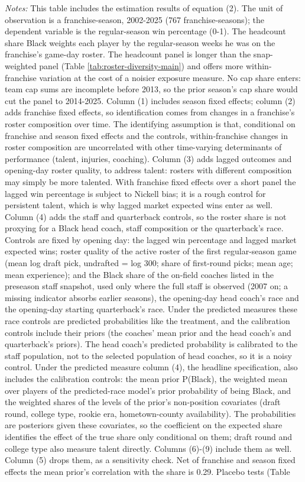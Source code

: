 {\footnotesize
\noindent\textit{Notes:} This table includes the estimation results of equation (2). The unit of observation is a franchise-season, 2002-2025 (767 franchise-seasons); the dependent variable is the regular-season win percentage (0-1). The headcount share Black weights each player by the regular-season weeks he was on the franchise's game-day roster. The headcount panel is longer than the snap-weighted panel (Table \ref{tab:roster-diversity-main}) and offers more within-franchise variation at the cost of a noisier exposure measure. No cap share enters: team cap sums are incomplete before 2013, so the prior season's cap share would cut the panel to 2014-2025. Column (1) includes season fixed effects; column (2) adds franchise fixed effects, so identification comes from changes in a franchise's roster composition over time. The identifying assumption is that, conditional on franchise and season fixed effects and the controls, within-franchise changes in roster composition are uncorrelated with other time-varying determinants of performance (talent, injuries, coaching). Column (3) adds lagged outcomes and opening-day roster quality, to address talent: rosters with different composition may simply be more talented. With franchise fixed effects over a short panel the lagged win percentage is subject to Nickell bias; it is a rough control for persistent talent, which is why lagged market expected wins enter as well. Column (4) adds the staff and quarterback controls, so the roster share is not proxying for a Black head coach, staff composition or the quarterback's race. Controls are fixed by opening day: the lagged win percentage and lagged market expected wins; roster quality of the active roster of the first regular-season game (mean log draft pick, undrafted = log 300; share of first-round picks; mean age; mean experience); and the Black share of the on-field coaches listed in the preseason staff snapshot, used only where the full staff is observed (2007 on; a missing indicator absorbs earlier seasons), the opening-day head coach's race and the opening-day starting quarterback's race. Under the predicted measures these race controls are predicted probabilities like the treatment, and the calibration controls include their priors (the coaches' mean prior and the head coach's and quarterback's priors). The head coach's predicted probability is calibrated to the staff population, not to the selected population of head coaches, so it is a noisy control. Under the predicted measure column (4), the headline specification, also includes the calibration controls: the mean prior P(Black), the weighted mean over players of the predicted-race model's prior probability of being Black, and the weighted shares of the levels of the prior's non-position covariates (draft round, college type, rookie era, hometown-county availability). The probabilities are posteriors given these covariates, so the coefficient on the expected share identifies the effect of the true share only conditional on them; draft round and college type also measure talent directly. Columns (6)-(9) include them as well. Column (5) drops them, as a sensitivity check. Net of franchise and season fixed effects the mean prior's correlation with the  share is 0.29. Placebo tests (Table }
